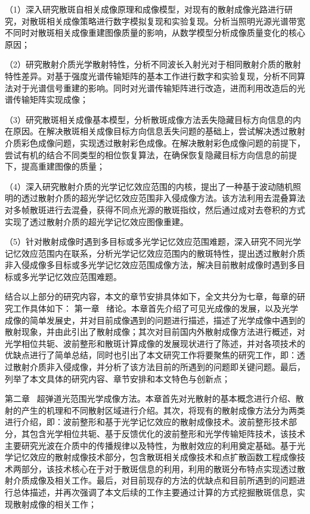 （1）深入研究散斑自相关成像原理和成像模型，对现有的散射成像光路进行研究，对散斑相关成像策略进行数字模拟复现和实验复现。分析当照明光源光谱带宽不同时对散斑相关成像重建图像质量的影响，从数学模型分析成像质量变化的核心原因；

（2）研究散射介质光学散射特性，分析不同波长入射光对于相同散射介质的散射特性差异。对基于强度光谱传输矩阵的基本工作进行数字和实验复现，分析不同算法对于光谱信号重建的影响。同时对光谱传输矩阵进行改造，进而利用改造后的光谱传输矩阵实现成像；

（3）研究散斑相关成像基本模型，分析散斑成像方法丢失隐藏目标方向信息的内在原因。在解决散斑相关成像目标方向信息丢失问题的基础上，尝试解决透过散射介质彩色成像问题，实现透过散射彩色成像。在解决散射彩色成像问题的前提下，尝试有机的结合不同类型的相位恢复算法，在确保恢复隐藏目标方向信息的前提下，提高重建图像的质量；

（4）深入研究散射介质的光学记忆效应范围的内核，提出了一种基于波动随机照明的透过散射介质的超光学记忆效应范围非入侵成像方法。该方法利用去混叠算法对多帧散斑进行去混叠，获得不同点光源的散斑指纹，然后通过成对去卷积的方式实现了透过散射介质的超光学记忆效应图像重建。

（5）针对散射成像时遇到多目标或多光学记忆效应范围难题，深入研究不同光学记忆效应范围内在联系，分析光学记忆效应范围内的散斑特性，提出透过散射介质非入侵成像多目标或多光学记忆效应范围成像方法，解决目前散射成像时遇到多目标或多光学记忆效应范围难题。

结合以上部分的研究内容，本文的章节安排具体如下，全文共分为七章，每章的研究工作具体如下：
第一章 \ 绪论。本章首先介绍了可见光成像的发展，以及光学成像的简单发展史，并对目前成像遇到的问题进行描述，描述了光学成像中遇到的散射现象，并由此引出了散射成像；其次对目前国内外散射成像方法进行概述，对光学相位共轭、波前整形和散斑计算成像的发展现状进行了陈述，并对各项技术的优缺点进行了简单总结，同时也引出了本文研究工作将要聚焦的研究工作，即：透过散射介质非入侵成像，并分析了该方法目前的所遇到的问题即关键问题。最后，列举了本文具体的研究内容、章节安排和本文特色与创新点；

第二章 \ 超弹道光范围光学成像方法。本章首先对光散射的基本概念进行介绍、散射的产生的机理和不同散射区域进行介绍。其次，将现有的散射成像方法分为两类进行介绍，即：波前整形和基于光学记忆效应的散射成像技术。波前整形技术部分，其包含光学相位共轭、基于反馈优化的波前整形和光学传输矩阵技术，该技术主要研究光波在介质中的传播规律以及特性，为散射效应的利用奠定基础。基于光学记忆效应的散射成像技术部分，包含散斑相关成像技术和点扩散函数工程成像技术两部分，该技术核心在于对于散斑信息的利用，利用的散斑分布特点实现透过散射介质成像及相关工作。最后，对目前现存的方法的优缺点和目前所遇到的问题进行总体描述，并再次强调了本文后续的工作主要通过计算的方式挖掘散斑信息，实现散射成像的相关工作；

